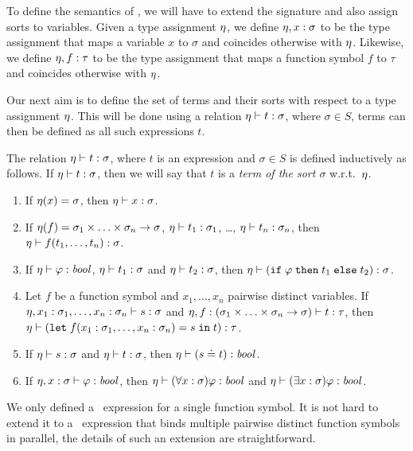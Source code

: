 To define the semantics of \folb, we will have to extend the signature and also assign sorts to variables. Given a type assignment $\eta$, we define $\eta,x:\sigma$ to be the type assignment that maps a variable $x$ to $\sigma$ and coincides otherwise with $\eta$. Likewise, we define $\eta,f:\tau$ to be the type assignment that maps a function symbol $f$ to $\tau$ and coincides otherwise with $\eta$.

Our next aim is to define the set of terms and their sorts with respect to a type assignment $\eta$. This will be done using a relation $\eta \vdash t:\sigma$, where $\sigma \in S$, terms can then be defined as all such expressions $t$.

\begin{definition}\label{def:folb-terms}
  The relation $\eta \vdash t:\sigma$, where $t$ is an expression and $\sigma \in S$ is defined inductively as follows. If $\eta \vdash t:\sigma$, then we will say that $t$ is a \emph{term of the sort $\sigma$} w.r.t.\ $\eta$.
  \begin{enumerate}
    \item If $\eta(x) = \sigma$, then $\eta \vdash x:\sigma$.

    \item If $\eta(f) = \sigma_1 \times \ldots \times \sigma_n \to \sigma$, $\eta \vdash t_1:\sigma_1$, \ldots, $\eta \vdash t_n:\sigma_n$, then $\eta \vdash  f(t_1, \ldots, t_n) : \sigma$.

    \item If $\eta \vdash \varphi:\mathit{bool}$, $\eta \vdash t_1:\sigma$ and $\eta \vdash t_2:\sigma$, then $\eta \vdash (\mathtt{if}\;{\varphi}\;\allowbreak\mathtt{then}\;{t_1}\;\allowbreak\mathtt{else}\;{t_2}):\sigma$.

    \item Let $f$ be a function symbol and $x_1,\ldots,x_n$ pairwise distinct variables. If $\eta,x_1:\sigma_1,\ldots,x_n:\sigma_n \vdash s:\sigma$ and $\eta,f:(\sigma_1\times \ldots \times\sigma_n \to\sigma) \vdash t : \tau$, then $\eta \vdash (\mathtt{let}\;{f(x_1:\sigma_1, \ldots, x_n:\sigma_n)}={s}\;\allowbreak\mathtt{in}\;{t}) : \tau$.

    \item If $\eta \vdash  s:\sigma$ and $\eta \vdash  t:\sigma$, then $\eta \vdash (s \doteq t) : \mathit{bool}$.

    \item If $\eta,x : \sigma \vdash \varphi : \mathit{bool}$, then $\eta \vdash (\forall x : \sigma)\varphi : \mathit{bool}$ and $\eta \vdash (\exists x:\sigma)\varphi : \mathit{bool}$. \QED
  \end{enumerate}
\end{definition}
We only defined a \LETIN\ expression for a single function symbol. It is not hard to extend it to a \LETIN\ expression that binds multiple pairwise distinct function symbols in parallel, the details of such an extension are straightforward.

